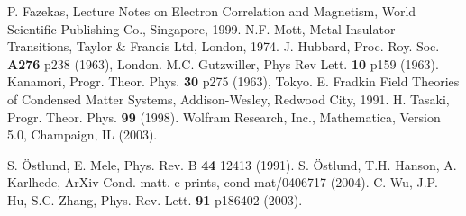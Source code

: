 \documentclass[a4paper,12pt,twoside,openright]{UGthesis}
\newcommand\rctr{\renewcommand{\theenumi}{\roman{enumi}}}
\begin{document}
\cleardoublepage
\pagestyle{fancy}
\renewcommand{\chaptermark}[1]{\markboth{Chapter \thechapter\ \ \ #1}{#1}}
\renewcommand{\sectionmark}[1]{\markright{\thesection\ \ #1}}
\lhead[\fancyplain{}{\sffamily\thepage}]%
  {\fancyplain{}{\sffamily\rightmark}}
\rhead[\fancyplain{}{\sffamily\leftmark}]%
  {\fancyplain{}{\sffamily\thepage}}
\cfoot{}
\setlength\headheight{14pt}

\rctr

\setcounter{page}{1}

%
%













\appendix
\pagestyle{plain}


%
%
\cleardoublepage
\pagestyle{plain}
\def\href#1#2{#2}

%

\clearpage 
\begin{thebibliography}{99}
\thispagestyle{fancy}

 P. Fazekas, Lecture Notes on Electron Correlation and
  Magnetism, World Scientific Publishing Co., Singapore, 1999.
N.F. Mott, Metal-Insulator Transitions, Taylor \& Francis Ltd,
  London, 1974.
 J. Hubbard, Proc. Roy. Soc. \textbf{A276} p238
  (1963), London. 
 M.C. Gutzwiller, Phys Rev Lett. \textbf{10} p159 (1963).
 Kanamori, Progr. Theor. Phys. \textbf{30} p275 (1963), Tokyo.
 E. Fradkin Field Theories of Condensed Matter
  Systems, Addison-Wesley, Redwood City, 1991.
 H. Tasaki, Progr. Theor. Phys. \textbf{99} (1998).
 Wolfram Research, Inc., Mathematica, Version
  5.0, Champaign, IL (2003). 

 S. \"Ostlund, E. Mele, Phys. Rev. B \textbf{44} 12413 (1991).
 S. \"Ostlund, T.H. Hanson, A. Karlhede, ArXiv
  Cond. matt. e-prints, cond-mat/0406717 (2004).
 C. Wu, J.P. Hu, S.C. Zhang,
  Phys. Rev. Lett. \textbf{91} p186402 (2003). 

\end{thebibliography}


%
%
\end{document}
